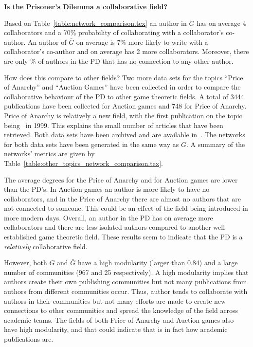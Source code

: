 \textbf{Is the Prisoner's Dilemma a collaborative field?}

Based on Table~\ref{table:network_comparison.tex} an author in \(G\) has on
average 4 collaborators and a 70\% probability of collaborating with a
collaborator's co-author. An author of \(\bar{G}\) on average is 7\% more likely
to write with a collaborator's co-author and on average has 2 more
collaborators. Moreover, there are only \isolatedpercentage\% of authors in the
PD that has no connection to any other author.

How does this compare to other fields? Two more data sets for the topics
``Price of Anarchy'' and ``Auction Games'' have been collected in order to
compare the collaborative behaviour of the PD to other game theoretic fields. A
total of 3444 publications have been collected for Auction games and 748 for
Price of Anarchy. Price of Anarchy is relatively a new field, with the first
publication on the topic being~\cite{Koutsoupias1999} in 1999. This explains the
small number of articles that have been retrieved. Both data sets have been
archived and are available in~\cite{auction_data_2018, anarchy_data_2018}.
The networks for both data sets have been generated in the same way as \(G\).
A summary of the networks' metrics are given by Table~\ref{table:other_topics_network_comparison.tex}.

The average degrees for the Price of Anarchy and for Auction games are lower
than the PD's. In Auction games an author is more likely to have no collaborators,
and in the Price of Anarchy there are almost no authors that are not connected
to someone. This could be an effect of the field being introduced in more modern
days. Overall, an author in the PD has on average more collaborators
and there are less isolated authors compared to another well established game
theoretic field. These results seem to indicate that the PD is a \textit{relatively} collaborative
field.

However, both \(G\) and \(\bar{G}\) have a high modularity (larger than 0.84) and a large number of
communities (967 and 25 respectively). A high modularity implies that authors create their own publishing
communities but not many publications from authors from different communities
occur. Thus, author tends to collaborate with authors in their communities but
not many efforts are made to create new connections to other communities and
spread the knowledge of the field across academic teams. The fields
of both Price of Anarchy and Auction games also have high modularity, and
that could indicate that is in fact how academic publications are.

